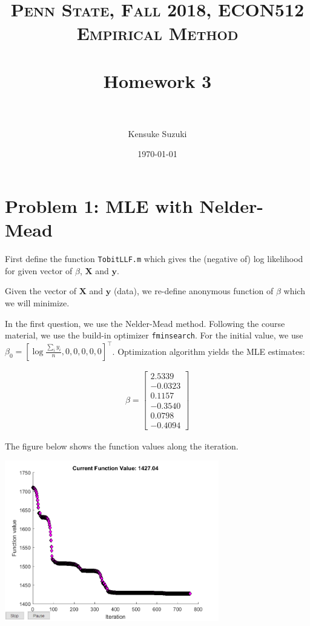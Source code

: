\documentclass[11pt,letter]{article}
\title{	
\normalfont \normalsize 
\textsc{Penn State, Fall 2018, ECON512 Empirical Method} \\ [25pt] %
\horrule{0.5pt} \\[0.4cm] %
\huge Homework 3 \\ %
\horrule{2pt} \\[0.5cm] %
}
\author{Kensuke Suzuki} %
\date{\normalsize\today} %
\newcommand{\vect}[1]{\boldsymbol{\mathbf{#1}}}
\newcounter{lem}[section] \setcounter{lem}{0}
\newcommand{\lprn}[1]{\left[{#1}\right]}
\newcommand{\code}[1]{\texttt{#1}}
\begin{document}
\maketitle %


\section*{Problem 1: MLE with Nelder-Mead}

First define the function \code{TobitLLF.m} which gives the (negative of) log likelihood for given vector of $\beta$, $\vect{X}$ and $\vect{y}$.




Given the vector of $\vect{X}$ and $\vect{y}$ (data), we re-define anonymous function of $\beta$ which we will minimize.

In the first question, we use the Nelder-Mead method. Following the course material, we use the build-in optimizer \code{fminsearch}. For the initial value, we use $\beta_0 = \lprn{\log\frac{\sum_i y_i}{n},0,0,0,0,0}^\top$. Optimization algorithm yields the MLE estimates:

\begin{align*}
\beta = \lprn{
\begin{array}{r}
 2.5339 \\
-0.0323\\
0.1157\\
-0.3540\\
0.0798\\
-0.4094
\end{array}
}
\end{align*}

The figure below shows the function values along the iteration. 

\begin{center}
\includegraphics[width=0.7\textwidth]{q1.png} 
\end{center}
\end{document}
